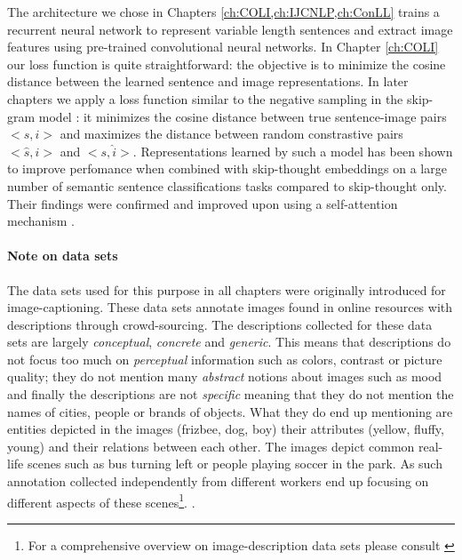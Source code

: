 The architecture we chose in
Chapters \ref{ch:COLI,ch:IJCNLP,ch:ConLL} trains a recurrent neural network to
represent variable length sentences and extract image features using pre-trained
convolutional neural networks. In Chapter \ref{ch:COLI} our loss function
is quite straightforward: the objective is to minimize the cosine distance
between the learned sentence and image representations. In later chapters we
apply a loss function similar to the negative sampling
in the skip-gram model \cite{mikolov2013distributed}: it minimizes the cosine
distance between true sentence-image pairs $<s, i>$ and maximizes the distance
between random constrastive pairs $<\hat{s}, i>$ and $<s, \hat{i}>$.
Representations learned by such a model has been shown \cite{kiela2017learning}
to improve perfomance when combined with skip-thought embeddings
on a large number of semantic sentence classifications tasks compared to
skip-thought only. Their findings were confirmed and improved upon using a
self-attention mechanism \cite{yoo2017improving}.

\paragraph{Note on data sets}


The data sets used for this purpose in all chapters were originally
introduced for image-captioning.
These data sets annotate images found in online resources with descriptions
through crowd-sourcing.
The descriptions collected for these data sets are largely \emph{conceptual}, \emph{concrete}
and \emph{generic}.
This means that descriptions do not focus too much on \emph{perceptual}
information such as colors, contrast or picture quality; they do not mention
many \emph{abstract} notions about images such as mood and finally the descriptions
are not \emph{specific} meaning that they do not mention the names of cities,
people or brands of objects.
What they do end up mentioning are entities depicted in the images
(frizbee, dog, boy) their attributes (yellow, fluffy, young) and their
relations between each other.
The images depict common real-life scenes such as bus turning left or people
playing soccer in the park. As such annotation collected independently from
different workers end up focusing on different aspects of these scenes\footnote{For a comprehensive overview on image-description data sets
please consult \cite{bernardi2016automatic}}.
.

